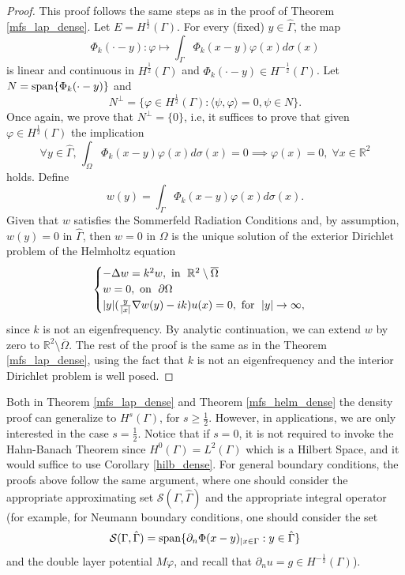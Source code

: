 \begin{proof}
    This proof follows the same steps as in the proof of Theorem \eqref{mfs_lap_dense}. Let \(E = H^\frac{1}{2}(\Gamma)\). For every (fixed) \(y \in \hat{\Gamma}\), the map
    \[
        \Phi_k(\cdot-y): \varphi \mapsto \int_\Gamma \Phi_k(x-y)\varphi(x)d\sigma(x)
    \]
    is linear and continuous in \(H^\frac{1}{2}(\Gamma)\) and \(\Phi_k(\cdot-y) \in H^{-\frac{1}{2}}(\Gamma)\). Let \(N = \operatorname{span}\{\Phi_k(\cdot-y)\}\) and
    \[
        N^\perp = \{\varphi \in H^\frac{1}{2}(\Gamma): \langle \psi, \varphi \rangle = 0, \psi \in N\}.
    \]
    Once again, we prove that \(N^\perp = \{0\}\), i.e, it suffices to prove that given \(\varphi \in H^\frac{1}{2}(\Gamma)\) the implication
    \[
        \forall y \in \hat{\Gamma}, \, \int_\Omega \Phi_k(x-y)\varphi(x)d\sigma(x) = 0 \implies \varphi(x) = 0, \; \forall x \in \mathbb{R}^2
    \]
    holds. Define
    \[
        w(y) = \int_\Gamma \Phi_k(x-y)\varphi(x)d\sigma(x).
    \]
    Given that \(w\) satisfies the Sommerfeld Radiation Conditions and, by assumption, \(w(y) = 0\) in \(\hat{\Gamma}\), then \(w = 0\) in \(\Omega\) is the unique solution of the exterior Dirichlet problem of the Helmholtz equation
    \[
        \begin{cases}
            -\Delta w = k^2 w, \text{ in } \; \mathbb{R}^2\setminus \overline{\Omega}\\
            w = 0, \text{ on } \; \partial \Omega\\
            \abs{y} (\frac{y}{\abs{x}}\nabla w(y) - i k)u(x) = 0, \text{ for } \; \abs{y} \rightarrow \infty,
        \end{cases}
    \]
    since \(k\) is not an eigenfrequency. By analytic continuation, we can extend \(w\) by zero to \(\mathbb{R}^2\setminus \overline{\Omega}\). The rest of the proof is the same as in the Theorem \eqref{mfs_lap_dense}, using the fact that \(k\) is not an eigenfrequency and the interior Dirichlet problem is well posed.
\end{proof}
\begin{remark}
    Both in Theorem \eqref{mfs_lap_dense} and Theorem \eqref{mfs_helm_dense} the density proof can generalize to \(H^s(\Gamma)\), for \(s \geq \frac{1}{2}\). However, in applications, we are only interested in the case \(s=\frac{1}{2}\). Notice that if \(s=0\), it is not required to invoke the Hahn-Banach Theorem since \(H^0(\Gamma)=L^2(\Gamma)\) which is a Hilbert Space, and it would suffice to use Corollary \eqref{hilb_dense}. For general boundary conditions, the proofs above follow the same argument, where one should consider the appropriate approximating set \(\mathcal{S}(\Gamma, \hat{\Gamma})\) and the appropriate integral operator (for example, for Neumann boundary conditions, one should consider the set
    \[
        \mathcal{S}(\Gamma, \hat{\Gamma}) = \operatorname{span}\{\partial_n \Phi(x-y)_{|x \in \Gamma} : y \in \hat{\Gamma}\}
    \]
    and the double layer potential \(M\varphi\), and recall that \(\partial_n u = g \in H^{-\frac{1}{2}}(\Gamma)\)).
\end{remark}
